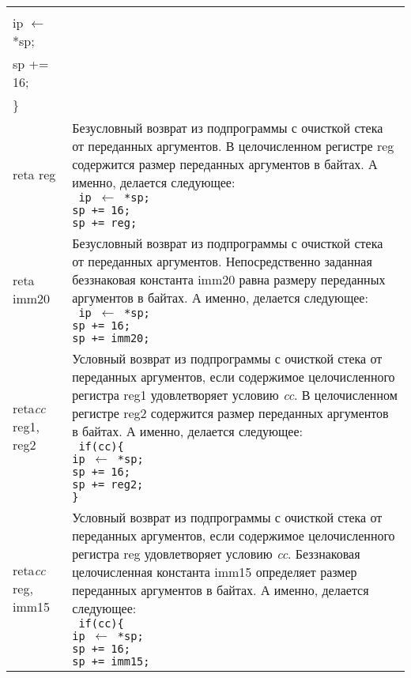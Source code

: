 \documentclass[10pt]{report}
\begin{document}
\begin{longtable}[c]{|l|p{12.5cm}|}
{{\texttt{%
if(cc)\{\\
\phantom{aaaa}ip $\leftarrow$ *sp;\\
\phantom{aaaa}sp += 16;\\
\}
}
}} \\ \hline
reta reg                     & {\parbox{12.4cm}{Безусловный возврат из подпрограммы с очисткой стека от переданных аргументов. В целочисленном регистре reg содержится размер переданных аргументов в байтах. А именно, делается следующее:\\ %
\texttt{%
\phantom{aaaa}ip $\leftarrow$ *sp;\\
\phantom{aaaa}sp += 16;\\
\phantom{aaaa}sp += reg;
}
}} \\ \hline
reta imm20                   & {\parbox{12.4cm}{Безусловный возврат из подпрограммы с очисткой стека от переданных аргументов. Непосредственно заданная беззнаковая константа imm20 равна размеру переданных аргументов в байтах. А именно, делается следующее:\\ %
\texttt{%
\phantom{aaaa}ip $\leftarrow$ *sp;\\
\phantom{aaaa}sp += 16;\\
\phantom{aaaa}sp += imm20;
}
}} \\ \hline
reta\textit{cc} reg1, reg2   & {\parbox{12.4cm}{Условный возврат из подпрограммы с очисткой стека от переданных аргументов, если содержимое целочисленного регистра reg1 удовлетворяет условию \textit{cc}. В целочисленном регистре reg2 содержится размер переданных аргументов в байтах. А именно, делается следующее:\\ %
\texttt{%
if(cc)\{\\
\phantom{aaaa}ip $\leftarrow$ *sp;\\
\phantom{aaaa}sp += 16;\\
\phantom{aaaa}sp += reg2;\\
\}
}
}} \\ \hline
reta\textit{cc} reg, imm15   & {\parbox{12.4cm}{Условный возврат из подпрограммы с очисткой стека от переданных аргументов, если содержимое целочисленного регистра reg удовлетворяет условию \textit{cc}. Беззнаковая целочисленная константа imm15 определяет размер переданных аргументов в байтах. А именно, делается следующее:\\ %
\texttt{%
if(cc)\{\\
\phantom{aaaa}ip $\leftarrow$ *sp;\\
\phantom{aaaa}sp += 16;\\
\phantom{aaaa}sp += imm15;\\
}}}
\end{longtable}
\end{document}
